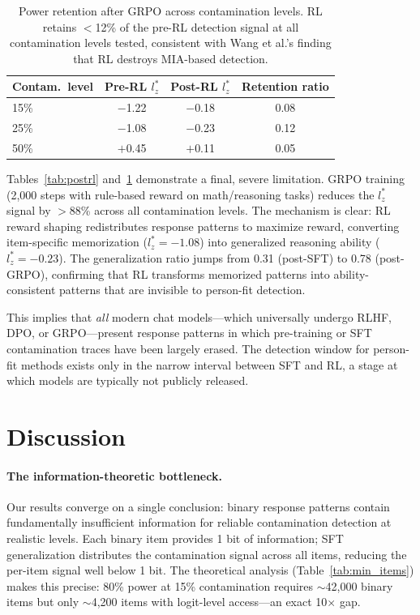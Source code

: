 \documentclass[11pt,a4paper]{article}
\newcommand{\lzstar}{$l_{z}^{*}$}
\begin{document}
\begin{table}[t]
\centering
\caption{Power retention after GRPO across contamination levels. RL retains $<$12\% of the pre-RL detection signal at all contamination levels tested, consistent with Wang et al.'s finding that RL destroys MIA-based detection.}
\label{tab:postrl_retention}
\small
\begin{tabular}{@{}lccc@{}}
\toprule
Contam.\ level & Pre-RL $l_z^*$ & Post-RL $l_z^*$ & Retention ratio \\
\midrule
15\% & $-$1.22 & $-$0.18 & 0.08 \\
25\% & $-$1.08 & $-$0.23 & 0.12 \\
50\% & $+$0.45 & $+$0.11 & 0.05 \\
\bottomrule
\end{tabular}
\end{table}

Tables~\ref{tab:postrl} and~\ref{tab:postrl_retention} demonstrate a final, severe limitation. GRPO training (2{,}000 steps with rule-based reward on math/reasoning tasks) reduces the \lzstar{} signal by $>$88\% across all contamination levels. The mechanism is clear: RL reward shaping redistributes response patterns to maximize reward, converting item-specific memorization ($l_z^* = -1.08$) into generalized reasoning ability ($l_z^* = -0.23$). The generalization ratio jumps from 0.31 (post-SFT) to 0.78 (post-GRPO), confirming that RL transforms memorized patterns into ability-consistent patterns that are invisible to person-fit detection.

This implies that \emph{all} modern chat models---which universally undergo RLHF, DPO, or GRPO---present response patterns in which pre-training or SFT contamination traces have been largely erased. The detection window for person-fit methods exists only in the narrow interval between SFT and RL, a stage at which models are typically not publicly released.

\section{Discussion}

\paragraph{The information-theoretic bottleneck.}
Our results converge on a single conclusion: binary response patterns contain fundamentally insufficient information for reliable contamination detection at realistic levels. Each binary item provides 1 bit of information; SFT generalization distributes the contamination signal across all items, reducing the per-item signal well below 1 bit. The theoretical analysis (Table~\ref{tab:min_items}) makes this precise: 80\% power at 15\% contamination requires $\sim$42{,}000 binary items but only $\sim$4{,}200 items with logit-level access---an exact 10$\times$ gap.
\end{document}
